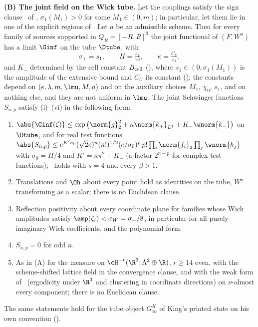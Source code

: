 \begin{theorem}
\medskip\noindent\textbf{(B) The joint field on the Wick tube.} Let the couplings satisfy the sign clause
\Tthree\ of , $\sigma_1(M_1)>0$ for some $M_1\in(0,m)$; in particular, let them lie in
one of the explicit regions of . Let $a$ be an admissible scheme. Then for every
family of sources supported in $Q_R=[-R,R]^3$ the joint functional of $(F,W^a)$ has a limit $\Ginf$ on
the tube $\Dtube$, with
\[
\sigma_+=s_1,\qquad H=\tfrac{s_1}{16},\qquad \kappa=\tfrac{C_U}{s_1},
\]
and $K_-$ determined by the cell constant $B_{\rm cell}$ (), where
$s_1\in(0,\sigma_1(M_1))$ is the amplitude of the extensive bound and $C_U$ its constant
(); the constants depend on $(e,\lambda,m,\lmu,M,a)$ and on the auxiliary choices $M_1$,
$\chi_0$, $s_1$, and on nothing else, and they are not uniform in $\lmu$. The joint Schwinger functions
$S_{n,p}$ satisfy \textup{(i)--(vi)} in the following form:
\begin{enumerate}[label=\textup{(\roman*)},leftmargin=*]
\item $\abs{\Ginf(\zeta)}\le\exp\big(\norm{g}_2^2+\kappa\norm{k_+}_{L^1}+K_-\wnorm{k_-}\big)$ on
$\Dtube$, and for real test functions
$\abs{S_{n,p}}\le e^{K'\sigma_0}(\sqrt2e)^n(n!)^{1/2}(e/\sigma_0)^p\,p!\prod_i\norm{f_i}_2\prod_j\wnorm{h_j}$
with $\sigma_0=H/4$ and $K'=\kappa\pi^2+K_-$ (a factor $2^{n+p}$ for complex test functions); \Ezz\ holds
with $s=4$ and every $\beta>1$.
\item Translations and $\Oh$ about every point hold as identities on the tube, $W^a$ transforming as a
scalar; there is no Euclidean clause.
\item Reflection positivity about every coordinate plane for families whose Wick amplitudes satisfy
$\amp(\zeta_i)<\sigma_W=\sigma_+/8$, in particular for all purely imaginary Wick coefficients, and the
polynomial form.
\item $S_{n,p}=0$ for odd $n$.
\item[\textup{(v), (vi)}] As in \textup{(A)} for the measure on $\cH^{-r}(\R^3;\Lambda^2\oplus\R)$,
$r\ge14$ even, with the scheme-shifted lattice field in the convergence clause, and with the weak form of
\OSf\ (ergodicity under $\R^3$ and clustering in coordinate directions) on $\nu$-almost every component;
there is no Euclidean clause.
\end{enumerate}
The same statements hold for the tube object $G^K_\infty$ of King's printed state on his own convention
().
\end{theorem}

